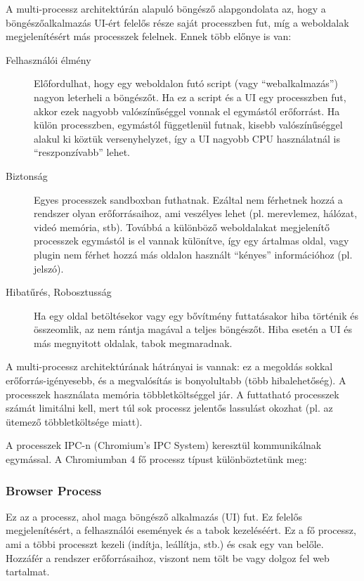 \documentclass[12pt]{report}
\begin{document}
A multi-processz architektúrán alapuló böngésző alapgondolata az, hogy a böngészőalkalmazás
UI-ért felelős része saját processzben fut, míg a weboldalak megjelenítésért más
processzek felelnek. Ennek több előnye is van: \cite{bib:chromium-blog-multi-process}
\begin{description}
    \item[Felhasználói élmény]
        Előfordulhat, hogy egy weboldalon futó script (vagy ``webalkalmazás'')
        nagyon leterheli a böngészőt. Ha ez a script és a UI egy processzben fut,
        akkor ezek nagyobb valószínűséggel vonnak el egymástól erőforrást. Ha külön
        processzben, egymástól függetlenül futnak, kisebb valószínűséggel alakul ki
        köztük versenyhelyzet, így a UI nagyobb CPU használatnál is ``reszponzívabb''
        lehet.
    \item[Biztonság]
        Egyes processzek sandboxban futhatnak. Ezáltal nem férhetnek hozzá a rendszer
        olyan erőforrásaihoz, ami veszélyes lehet (pl. merevlemez, hálózat,
        videó memória, stb).
        Továbbá a különböző weboldalakat megjelenítő processzek egymástól is el vannak
        különítve, így egy ártalmas oldal, vagy plugin nem férhet hozzá más oldalon használt
        ``kényes'' információhoz (pl. jelszó).
    \item[Hibatűrés, Robosztusság]
        Ha egy oldal betöltésekor vagy egy bővítmény futtatásakor hiba történik és
        összeomlik, az nem rántja magával a teljes böngészőt. Hiba esetén a UI és más
        megnyitott oldalak, tabok megmaradnak.
\end{description}

A multi-processz architektúrának hátrányai is vannak: ez a megoldás sokkal
erőforrás-igényesebb, és a megvalósítás is bonyolultabb (több hibalehetőség).
A processzek használata memória többletköltséggel jár. A futtatható processzek
számát limitálni kell, mert túl sok processz jelentős lassulást okozhat (pl. az ütemező
többletköltsége miatt).

A processzek IPC-n (Chromium's IPC System) keresztül kommunikálnak egymással.
A Chromiumban 4 fő processz típust különböztetünk meg:

\subsubsection{Browser Process}
Ez az a processz, ahol maga böngésző alkalmazás (UI) fut. Ez felelős megjelenítésért,
a felhasználói események és a tabok kezeléséért. Ez a fő processz, ami a többi processzt
kezeli (indítja, leállítja, stb.) és csak egy van belőle. Hozzáfér a rendszer erőforrásaihoz,
viszont nem tölt be vagy dolgoz fel web tartalmat.
\end{document}
